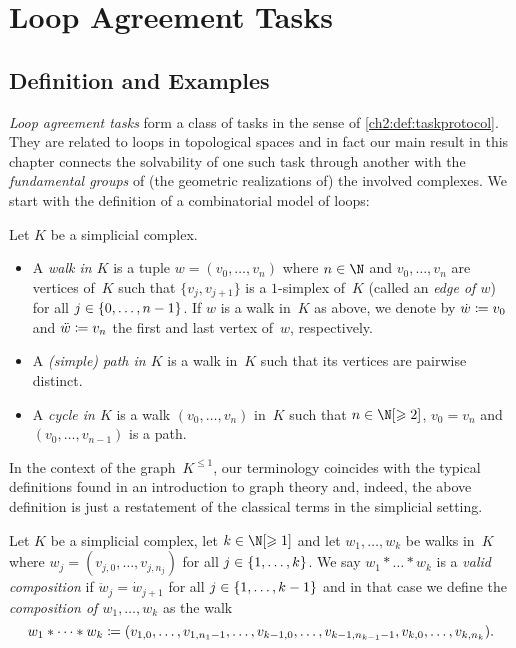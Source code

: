 \chapter{Loop Agreement Tasks}
\label{ch3}
\section{Definition and Examples}
\emph{Loop agreement tasks} form a class of tasks in the sense of
\cref{ch2:def:taskprotocol}. They are related to loops in topological spaces
and in fact our main result in this chapter 
connects the solvability of one such task through another with the
\emph{fundamental groups} of (the geometric realizations of) the
involved complexes. We start with the definition of a combinatorial
model of loops:

\begin{thDef}
    \label{ch3:def:walkpathcycle}
    Let $K$ be a simplicial complex.
    \begin{itemize}
        \item
            A \emph{walk in $K$} is a tuple $w = (v_0,\dots,v_n)$
            where $n\in\N$ and $v_0,\dots,v_n$ are vertices
            of~$K$ such that $\{v_j,v_{j+1}\}$ is a $1$-simplex of~$K$
            (called an \emph{edge of $w$}) for all $j\in\{0,\ldots,n-1\}$.
            If $w$ is a walk in~$K$ as above, we denote by $\dot w \coloneqq v_0$
            and $\ddot w \coloneqq v_n$ the first and last vertex of~$w$,
            respectively.
            
        \item
            A \emph{(simple) path in $K$} is a walk in~$K$ such that its
            vertices are pairwise distinct.
            
        \item
            A \emph{cycle in $K$} is a walk $(v_0,\dots,v_n)$ in~$K$ such that
            $n\in\N[\geq2]$, $v_0 = v_n$ and $(v_0,\dots,v_{n-1})$ is a path.
    \end{itemize}
\end{thDef}

In the context of the graph~$K^{\leq 1}$, our terminology coincides with the
typical definitions found in an introduction to graph theory and, indeed, the
above definition is just a restatement of the classical terms in the simplicial
setting.

\begin{thDef}
    Let $K$ be a simplicial complex, let $k\in\N[\geq1]$ and let $w_1,\dots,w_k$
    be walks in~$K$ where $w_j = (v_{j,0}, \dots, v_{j,n_j})$ for all
    $j\in\{1,\ldots,k\}$.  We say $w_1\ast\dots\ast w_k$ is a \emph{valid
    composition} if $\ddot{w}_j = \dot{w}_{j+1}$ for all $j\in\{1,\ldots,k-1\}$
    and in that case we define the \emph{composition of $w_1,\dots,w_k$} as the
    walk
    \[ w_1\ast\dots\ast w_k
        \coloneqq (v_{1,0},\dots,v_{1,n_1-1},
                \dots,
                v_{k-1,0},\dots,v_{k-1,n_{k-1}-1},
                v_{k,0},\dots,v_{k,n_k})
    . \]
\end{thDef}

